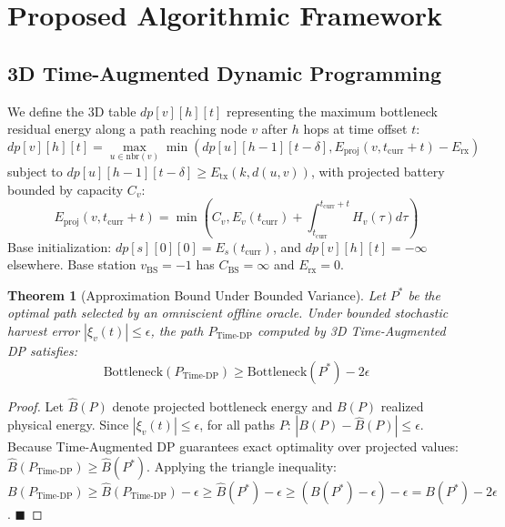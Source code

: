 \documentclass[conference]{IEEEtran}
\newtheorem{theorem}{Theorem}
\begin{document}
\section{Proposed Algorithmic Framework}

\subsection{3D Time-Augmented Dynamic Programming}
We define the 3D table $dp[v][h][t]$ representing the maximum bottleneck residual energy along a path reaching node $v$ after $h$ hops at time offset $t$:
\begin{equation}
dp[v][h][t] = \max_{u \in \text{nbr}(v)} \min\left( dp[u][h-1][t-\delta], E_{\text{proj}}(v, t_{\text{curr}} + t) - E_{\text{rx}} \right)
\end{equation}
subject to $dp[u][h-1][t-\delta] \ge E_{\text{tx}}(k, d(u, v))$, with projected battery bounded by capacity $C_v$:
\begin{equation}
E_{\text{proj}}(v, t_{\text{curr}} + t) = \min\left( C_v, E_v(t_{\text{curr}}) + \int_{t_{\text{curr}}}^{t_{\text{curr}}+t} H_v(\tau) d\tau \right)
\end{equation}
Base initialization: $dp[s][0][0] = E_s(t_{\text{curr}})$, and $dp[v][h][t] = -\infty$ elsewhere. Base station $v_{\text{BS}} = -1$ has $C_{\text{BS}} = \infty$ and $E_{\text{rx}} = 0$.

\begin{theorem}[Approximation Bound Under Bounded Variance]
Let $P^*$ be the optimal path selected by an omniscient offline oracle. Under bounded stochastic harvest error $|\xi_v(t)| \le \epsilon$, the path $P_{\text{Time-DP}}$ computed by 3D Time-Augmented DP satisfies:
\begin{equation}
\text{Bottleneck}(P_{\text{Time-DP}}) \ge \text{Bottleneck}(P^*) - 2\epsilon
\end{equation}
\end{theorem}
\begin{proof}
Let $\hat{B}(P)$ denote projected bottleneck energy and $B(P)$ realized physical energy. Since $|\xi_v(t)| \le \epsilon$, for all paths $P$: $|B(P) - \hat{B}(P)| \le \epsilon$. Because Time-Augmented DP guarantees exact optimality over projected values: $\hat{B}(P_{\text{Time-DP}}) \ge \hat{B}(P^*)$. Applying the triangle inequality:
$B(P_{\text{Time-DP}}) \ge \hat{B}(P_{\text{Time-DP}}) - \epsilon \ge \hat{B}(P^*) - \epsilon \ge (B(P^*) - \epsilon) - \epsilon = B(P^*) - 2\epsilon$. $\blacksquare$
\end{proof}
\end{document}
